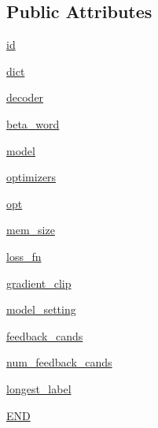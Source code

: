 \subsection*{Public Attributes}
\begin{DoxyCompactItemize}
\item 
\hyperlink{classagent_1_1memnn__feedback_1_1MemnnFeedbackAgent_a5e39fc0577b516ce1ae687fb4653dc96}{id}
\item 
\hyperlink{classagent_1_1memnn__feedback_1_1MemnnFeedbackAgent_a62aa745115d5a92505ba3009729d847b}{dict}
\item 
\hyperlink{classagent_1_1memnn__feedback_1_1MemnnFeedbackAgent_a0b926aaa958c42d697e60effddd28b12}{decoder}
\item 
\hyperlink{classagent_1_1memnn__feedback_1_1MemnnFeedbackAgent_ae346123416a65a225feefc4d3fc2db2e}{beta\+\_\+word}
\item 
\hyperlink{classagent_1_1memnn__feedback_1_1MemnnFeedbackAgent_a5ab4d8e7a66df50acef0e22c9f583fa7}{model}
\item 
\hyperlink{classagent_1_1memnn__feedback_1_1MemnnFeedbackAgent_a1bb9de6dda01a29501dfaaebf56877f6}{optimizers}
\item 
\hyperlink{classagent_1_1memnn__feedback_1_1MemnnFeedbackAgent_a215cfabdb79a192e5dabc0fb3e74e695}{opt}
\item 
\hyperlink{classagent_1_1memnn__feedback_1_1MemnnFeedbackAgent_ad7c797c81ed64c4db77e445cedc4526e}{mem\+\_\+size}
\item 
\hyperlink{classagent_1_1memnn__feedback_1_1MemnnFeedbackAgent_a634e55015bc44025c24a34ec11f5945d}{loss\+\_\+fn}
\item 
\hyperlink{classagent_1_1memnn__feedback_1_1MemnnFeedbackAgent_a85b24d168ba144d129d9b2bcfaf90aae}{gradient\+\_\+clip}
\item 
\hyperlink{classagent_1_1memnn__feedback_1_1MemnnFeedbackAgent_a6b23c35b66b0211a691ed4a9636b10c0}{model\+\_\+setting}
\item 
\hyperlink{classagent_1_1memnn__feedback_1_1MemnnFeedbackAgent_afc6ac2b20a83a3b766a5dd985d591277}{feedback\+\_\+cands}
\item 
\hyperlink{classagent_1_1memnn__feedback_1_1MemnnFeedbackAgent_ae033236aa7fa4e1328fa590042fe3f57}{num\+\_\+feedback\+\_\+cands}
\item 
\hyperlink{classagent_1_1memnn__feedback_1_1MemnnFeedbackAgent_abf7ccf8c4b95dd749e241f2993a699b1}{longest\+\_\+label}
\item 
\hyperlink{classagent_1_1memnn__feedback_1_1MemnnFeedbackAgent_a5beb885645239070a3a818a3006f49d8}{E\+ND}

\end{DoxyCompactItemize}
